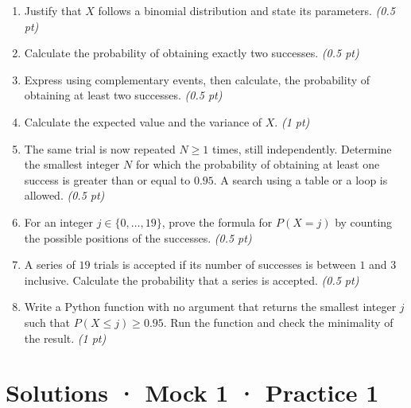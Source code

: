 \begin{enumerate}

\item Justify that $X$ follows a binomial distribution and state its parameters. \hfill\textit{(0.5 pt)}

\item Calculate the probability of obtaining exactly two successes. \hfill\textit{(0.5 pt)}

\item Express using complementary events, then calculate, the probability of obtaining at least two successes. \hfill\textit{(0.5 pt)}

\item Calculate the expected value and the variance of $X$. \hfill\textit{(1 pt)}

\item The same trial is now repeated $N\ge1$ times, still independently. Determine the smallest integer $N$ for which the probability of obtaining at least one success is greater than or equal to $\num{0,95}$. A search using a table or a loop is allowed. \hfill\textit{(0.5 pt)}

\item For an integer $j\in\{0,\ldots,19\}$, prove the formula for $P(X=j)$ by counting the possible positions of the successes. \hfill\textit{(0.5 pt)}

\item A series of $19$ trials is accepted if its number of successes is between $1$ and $3$ inclusive. Calculate the probability that a series is accepted. \hfill\textit{(0.5 pt)}

\item Write a Python function with no argument that returns the smallest integer $j$ such that $P(X\le j)\ge\num{0,95}$. Run the function and check the minimality of the result. \hfill\textit{(1 pt)}

\end{enumerate}

\ifmxteacher\mxnewpage

\section*{Solutions · Mock 1 · Practice 1}\label{cor:5-1}

